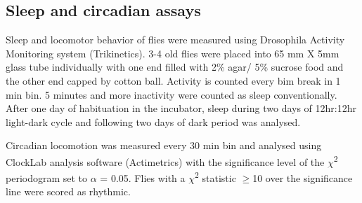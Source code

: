 \subsection*{Sleep and circadian assays}

Sleep and locomotor behavior of flies were measured using Drosophila Activity Monitoring system (Trikinetics).
3-4 old flies were placed into 65 mm X 5mm glass tube individually with one end filled with 2\% agar/ 5\% sucrose food and the other end capped by cotton ball.
Activity is counted every bim break in 1 min bin.
5 minutes and more inactivity were counted as sleep conventionally.
After one day of habituation in the incubator, sleep during two days of 12hr:12hr light-dark cycle and following two days of dark period was analysed.

Circadian locomotion was measured every 30 min bin and analysed using ClockLab analysis software (Actimetrics) with the significance level of the $\chi$\textsuperscript{2} periodogram set to $\alpha$ = 0.05.
Flies with a $\chi$\textsuperscript{2} statistic $\geq$10 over the significance line were scored as rhythmic.
    
  
  
  
  
  